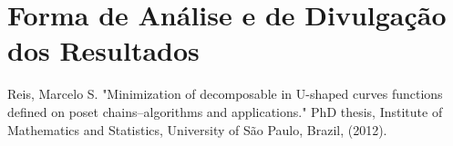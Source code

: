 \documentclass[12pt]{article}
\begin{document}
\section{Forma de Análise e de Divulgação dos Resultados}

\newpage
\begin{thebibliography}{}
    Reis, Marcelo S. "Minimization of decomposable in U-shaped curves 
    functions defined on poset chains–algorithms and applications."
    PhD thesis, Institute of Mathematics and Statistics, University of
    São Paulo, Brazil, (2012).


\end{thebibliography}
\end{document}
